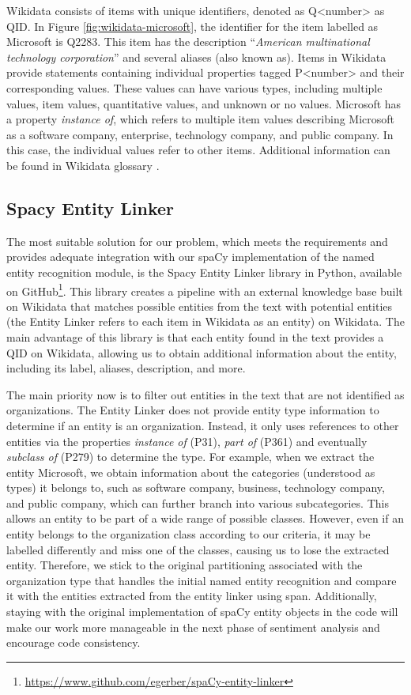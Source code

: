 Wikidata consists of items with unique identifiers, denoted as Q<number> as QID. In Figure \ref{fig:wikidata-microsoft}, the identifier for the item labelled as Microsoft is Q2283. This item has the description ``\textit{American multinational technology corporation}'' and several aliases (also known as). Items in Wikidata provide statements containing individual properties tagged P<number> and their corresponding values. These values can have various types, including multiple values, item values, quantitative values, and unknown or no values. Microsoft has a property \textit{instance of}, which refers to multiple item values describing Microsoft as a software company, enterprise, technology company, and public company. In this case, the individual values refer to other items. Additional information can be found in Wikidata glossary \parencite{wikidata_glossary}.

\subsection{Spacy Entity Linker}
\label{subsec:spacy-entity-linker}
The most suitable solution for our problem, which meets the requirements and provides adequate integration with our spaCy implementation of the named entity recognition module, is the Spacy Entity Linker library in Python, available on GitHub\footnote{\href{https://www.github.com/egerber/spaCy-entity-linker}{https://www.github.com/egerber/spaCy-entity-linker}}. This library creates a pipeline with an external knowledge base built on Wikidata that matches possible entities from the text with potential entities (the Entity Linker refers to each item in Wikidata as an entity) on Wikidata. The main advantage of this library is that each entity found in the text provides a QID on Wikidata, allowing us to obtain additional information about the entity, including its label, aliases, description, and more.

The main priority now is to filter out entities in the text that are not identified as organizations. The Entity Linker does not provide entity type information to determine if an entity is an organization. Instead, it only uses references to other entities via the properties \textit{instance of} (P31), \textit{part of} (P361) and eventually \textit{subclass of} (P279) to determine the type. For example, when we extract the entity Microsoft, we obtain information about the categories (understood as types) it belongs to, such as software company, business, technology company, and public company, which can further branch into various subcategories. This allows an entity to be part of a wide range of possible classes. However, even if an entity belongs to the organization class according to our criteria, it may be labelled differently and miss one of the classes, causing us to lose the extracted entity. Therefore, we stick to the original partitioning associated with the organization type that handles the initial named entity recognition and compare it with the entities extracted from the entity linker using span. Additionally, staying with the original implementation of spaCy entity objects in the code will make our work more manageable in the next phase of sentiment analysis and encourage code consistency.

